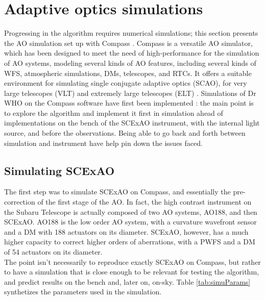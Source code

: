 \documentclass[twocolumn]{aastex62}
\begin{document}
\section{Adaptive optics simulations}
Progressing in the algorithm requires numerical simulations; this section presents the AO simulation set up with Compass \citep{Compass}.
Compass is a versatile AO simulator, which has been designed to meet the need of high-performance for the simulation of AO systems, modeling several kinds of AO features, including several kinds of WFS, atmospheric simulations, DMs, telescopes, and RTCs. It offers a suitable environment for simulating single conjugate adaptive optics (SCAO), for very large telescopes (VLT) and extremely large telescopes (ELT) \citep{Vidal2018}.  Simulations of Dr WHO on the Compass software have first been implemented : the main point is to explore the algorithm and implement it first in simulation ahead of implementations on the bench of the SCExAO instrument, with the internal light source, and before the observations. Being able to go back and forth between simulation and instrument have help pin down the issues faced.  \\

\subsection{Simulating SCExAO}
The first step was to simulate SCExAO on Compass, and essentially the pre-correction of the first stage of the AO. In fact, the high contrast instrument on the Subaru Telescope is actually composed of two AO systems, AO188, and then SCExAO. AO188 is the low order AO system, with a curvature wavefront sensor and a DM with 188 actuators on its diameter. SCExAO, however, has a much higher capacity to correct higher orders of aberrations, with a PWFS and a DM of 54 actuators on its diameter. \\

The point isn't necessarily to reproduce exactly SCExAO on Compass, but rather to have a simulation that is close enough to be relevant for testing the algorithm, and predict results on the bench and, later on, on-sky. Table \ref{tab:simuParams} synthetizes the parameters used in the simulation.\\
\end{document}
